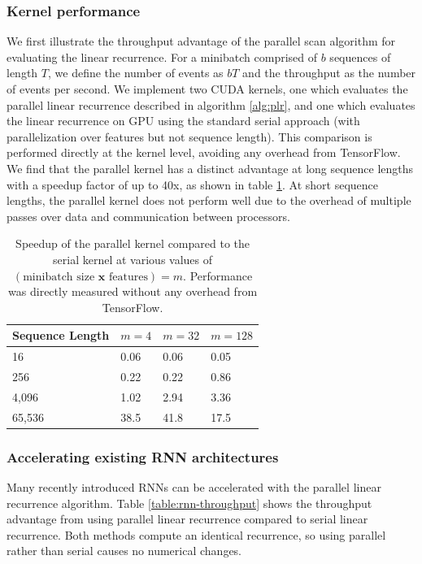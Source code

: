 \documentclass{article}
\begin{document}
\subsubsection{Kernel performance}
We first illustrate the throughput advantage of the parallel scan algorithm for
evaluating the linear recurrence. For a minibatch comprised of \(b\) sequences
of length \(T\), we define the number of events as \(bT\) and the throughput as
the number of events per second. We implement two CUDA kernels, one which
evaluates the parallel linear recurrence described in algorithm \ref{alg:plr},
and one which evaluates the linear recurrence on GPU using the standard serial
approach (with parallelization over features but not sequence length).
This comparison is performed directly at the kernel level, avoiding
any overhead from TensorFlow. We find that the parallel kernel has
a distinct advantage at long sequence lengths with a speedup factor of up to 40x,
as shown in table \ref{table:kernel-throughput}.
At short sequence lengths, the parallel kernel does not perform well due to the
overhead of multiple passes over data and communication between processors.
\begin{table}
\begin{center}
  \begin{tabular}{@{}llll@{}}
    \label{table:kernel-throughput}
Sequence Length & \(m=4\)  & \(m=32\) & \(m=128\) \\ \midrule
16              & 0.06 & 0.06 & 0.05  \\
256             & 0.22 & 0.22 & 0.86  \\
4,096           & 1.02 & 2.94 & 3.36  \\
65,536          & 38.5 & 41.8 & 17.5  \\ \bottomrule
  \end{tabular}
\end{center}
\caption{
  Speedup of the parallel kernel compared to the serial kernel at various
  values of $(\text{minibatch size } \mathbf{x} \text{ features}) = m$.
  Performance was directly measured without any overhead from TensorFlow.
}
\end{table}

\subsubsection{Accelerating existing RNN architectures}

Many recently introduced RNNs can be accelerated with the parallel linear recurrence
algorithm.
Table \ref{table:rnn-throughput} shows the
throughput advantage from using parallel linear recurrence compared to
serial linear recurrence. Both methods compute an identical recurrence,
so using parallel rather than serial causes no numerical changes.
\end{document}
